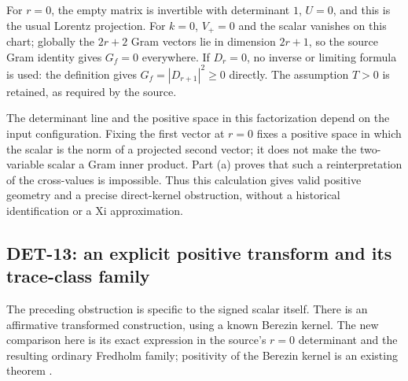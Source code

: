 \documentclass[11pt,a4paper]{article}
\begin{document}
For \(r=0\), the empty matrix is invertible with determinant \(1\),
\(U=0\), and this is the usual Lorentz projection.
For \(k=0\), \(V_+=0\) and the scalar vanishes on this chart;
globally the \(2r+2\) Gram vectors lie in dimension \(2r+1\), so
the source Gram identity gives \(G_f=0\) everywhere.
If \(D_r=0\), no inverse or limiting formula is used:
the definition gives \(G_f=|D_{r+1}|^2\ge0\) directly.
The assumption \(T>0\) is retained, as required by the source.

The determinant line and the positive space in this factorization
depend on the input configuration. Fixing the first vector at \(r=0\)
fixes a positive space in which the scalar is the norm of a projected
second vector; it does not make the two-variable scalar a Gram
inner product. Part (a) proves that such a reinterpretation of the
cross-values is impossible. Thus this calculation gives valid positive
geometry and a precise direct-kernel obstruction, without a historical
identification or a Xi approximation.

\subsection{DET-13: an explicit positive transform and its trace-class family}

The preceding obstruction is specific to the signed scalar itself.  There is
an affirmative transformed construction, using a known Berezin kernel.  The
new comparison here is its exact expression in the source's $r=0$ determinant
and the resulting ordinary Fredholm family; positivity of the Berezin kernel
is an existing theorem \cite[Theorem 3.8, \S4.1 (4.1), \S4.4 (4.7)--(4.9)]{neretin}.
\end{document}
